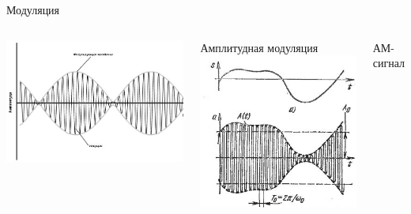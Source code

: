 \begin{frame}{Модуляция}
    \begin{columns}
        \centering
        \includegraphics[width=1\linewidth]{../Figures/am.jpg}

        Амплитудная модуляция
        \centering
        \includegraphics[width=.7\linewidth]{../Figures/amclose.jpg}

        АМ-сигнал
    \end{columns}
\end{frame}

